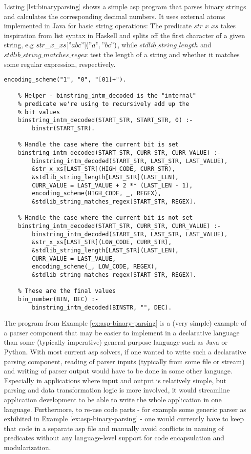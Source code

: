 \begin{example}
\label{ex:asp-binary-parsing}
Listing \ref{lst:binaryparsing} shows a simple \gls{asp} program that parses binary strings and calculates the corresponding decimal numbers. It uses external atoms implemented in Java for basic string operations: The predicate $str\_x\_xs$ takes inspiration from list syntax in Haskell and splits off the first character of a given string, e.g $str\_x\_xs["abc"]("a", "bc")$, while $stdlib\_string\_length$ and $stdlib\_string\_matches\_regex$ test the length of a string and whether it matches some regular expression, respectively. 
\begin{lstlisting}[style=asp-code, caption=Parsing binary strings in ASP, label={lst:binaryparsing}]
    encoding_scheme("1", "0", "[01]+").

    % Helper - binstring_intm_decoded is the "internal" 
    % predicate we're using to recursively add up the 
    % bit values
    binstring_intm_decoded(START_STR, START_STR, 0) :- 
        binstr(START_STR). 
    
    % Handle the case where the current bit is set
    binstring_intm_decoded(START_STR, CURR_STR, CURR_VALUE) :- 
        binstring_intm_decoded(START_STR, LAST_STR, LAST_VALUE),
        &str_x_xs[LAST_STR](HIGH_CODE, CURR_STR),
        &stdlib_string_length[LAST_STR](LAST_LEN),
        CURR_VALUE = LAST_VALUE + 2 ** (LAST_LEN - 1),
        encoding_scheme(HIGH_CODE, _, REGEX),
        &stdlib_string_matches_regex[START_STR, REGEX].
    
    % Handle the case where the current bit is not set
    binstring_intm_decoded(START_STR, CURR_STR, CURR_VALUE) :- 
        binstring_intm_decoded(START_STR, LAST_STR, LAST_VALUE),
        &str_x_xs[LAST_STR](LOW_CODE, CURR_STR),
        &stdlib_string_length[LAST_STR](LAST_LEN),
        CURR_VALUE = LAST_VALUE,
        encoding_scheme(_, LOW_CODE, REGEX),
        &stdlib_string_matches_regex[START_STR, REGEX].
    
    % These are the final values
    bin_number(BIN, DEC) :- 
        binstring_intm_decoded(BINSTR, "", DEC).    
\end{lstlisting}
\end{example}    

The program from Example \ref{ex:asp-binary-parsing} is a (very simple) example of a parser component that may be easier to implement in a declarative language than some (typically imperative) general purpose language such as Java or Python. With most current \gls{asp} solvers, if one wanted to write such a declarative parsing component, reading of parser inputs (typically from some file or stream) and writing of parser output would have to be done in some other language. Especially in applications where input and output is relatively simple, but parsing and data transformation logic is more involved, it would streamline application development to be able to write the whole application in one language. Furthermore, to re-use code parts - for example some generic parser as exhibited in Example \ref{ex:asp-binary-parsing} - one would currently have to keep that code in a separate \gls{asp} file and manually avoid conflicts in naming of predicates without any language-level support for code encapsulation and modularization. 

